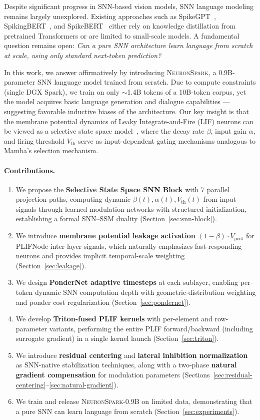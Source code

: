 \documentclass{article}
\newcommand{\model}{\textsc{NeuronSpark}}
\newcommand{\vpost}{V_{\text{post}}}
\newcommand{\vth}{V_{\text{th}}}
\begin{document}
Despite significant progress in SNN-based vision models, SNN language modeling remains largely unexplored.
Existing approaches such as SpikeGPT~\citep{zhu2024spikegpt}, SpikingBERT~\citep{bal2024spikingbert}, and SpikeBERT~\citep{lv2023spikebert} either rely on knowledge distillation from pretrained Transformers or are limited to small-scale models.
A fundamental question remains open: \emph{Can a pure SNN architecture learn language from scratch at scale, using only standard next-token prediction?}

In this work, we answer affirmatively by introducing \model{}, a 0.9B-parameter SNN language model trained from scratch.
Due to compute constraints (single DGX Spark), we train on only $\sim$1.4B tokens of a 10B-token corpus, yet the model acquires basic language generation and dialogue capabilities --- suggesting favorable inductive biases of the architecture.
Our key insight is that the membrane potential dynamics of Leaky Integrate-and-Fire (LIF) neurons can be viewed as a selective state space model~\citep{gu2024mamba}, where the decay rate $\beta$, input gain $\alpha$, and firing threshold $\vth$ serve as input-dependent gating mechanisms analogous to Mamba's selection mechanism.

\paragraph{Contributions.}
\begin{enumerate}
    \item We propose the \textbf{Selective State Space SNN Block} with 7 parallel projection paths, computing dynamic $\beta(t), \alpha(t), \vth(t)$ from input signals through learned modulation networks with structured initialization, establishing a formal SNN--SSM duality (Section~\ref{sec:snn-block}).
    \item We introduce \textbf{membrane potential leakage activation} $(1-\beta)\cdot\vpost$ for PLIFNode inter-layer signals, which naturally emphasizes fast-responding neurons and provides implicit temporal-scale weighting (Section~\ref{sec:leakage}).
    \item We design \textbf{PonderNet adaptive timesteps} at each sublayer, enabling per-token dynamic SNN computation depth with geometric-distribution weighting and ponder cost regularization (Section~\ref{sec:pondernet}).
    \item We develop \textbf{Triton-fused PLIF kernels} with per-element and row-parameter variants, performing the entire PLIF forward/backward (including surrogate gradient) in a single kernel launch (Section~\ref{sec:triton}).
    \item We introduce \textbf{residual centering} and \textbf{lateral inhibition normalization} as SNN-native stabilization techniques, along with a two-phase \textbf{natural gradient compensation} for modulation parameters (Sections~\ref{sec:residual-centering}--\ref{sec:natural-gradient}).
    \item We train and release \model{}-0.9B on limited data, demonstrating that a pure SNN can learn language from scratch (Section~\ref{sec:experiments}).
\end{enumerate}
\end{document}
